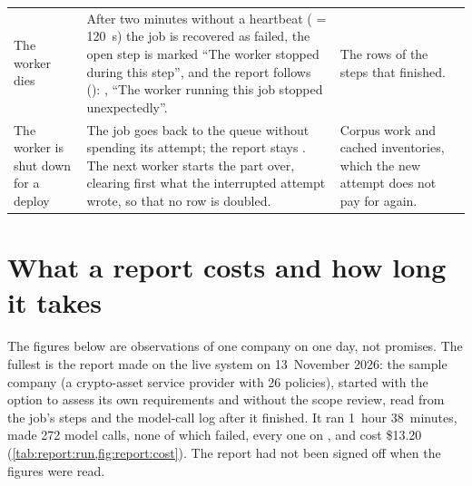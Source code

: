 \begin{xltabular}{\textwidth}{@{}L{34mm}YL{40mm}@{}}
The worker dies & After two minutes without a heartbeat ( = 120~s) the job is recovered as failed, the open step is marked \enquote{The worker stopped during this step}, and the report follows (): , \enquote{The worker running this job stopped unexpectedly}. & The rows of the steps that finished. \\
The worker is shut down for a deploy & The job goes back to the queue without spending its attempt; the report stays . The next worker starts the part over, clearing first what the interrupted attempt wrote, so that no row is doubled. & Corpus work and cached inventories, which the new attempt does not pay for again. \\
\end{xltabular}


\section{What a report costs and how long it takes}\label{sec:report:cost}

The figures below are observations of one company on one day, not promises. The fullest is the
report made on the live system on 13~November 2026: the sample company \demo{} (a crypto-asset
service provider with 26 policies), started with the option to assess its own requirements and
without the scope review, read from the job's steps and the model-call log after it finished.
It ran 1~hour 38~minutes, made 272 model calls, none of which failed, every one on
, and cost \$13.20 (\cref{tab:report:run,fig:report:cost}). The report had
not been signed off when the figures were read.

